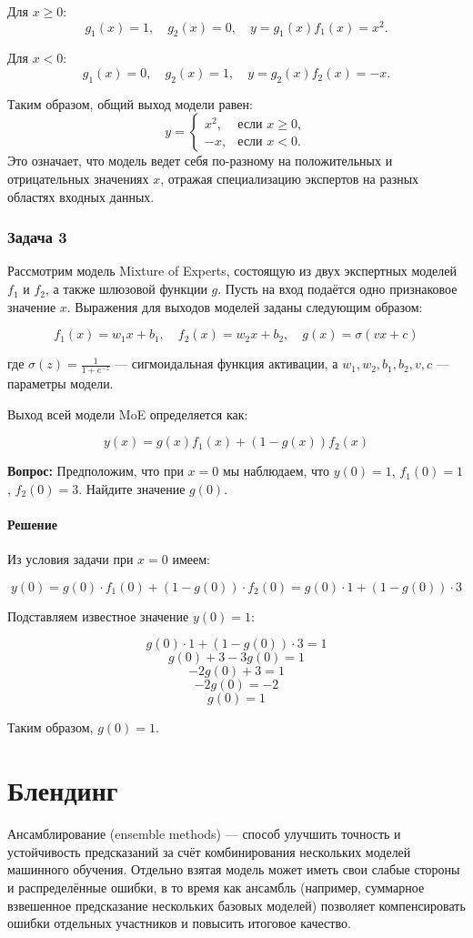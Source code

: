 Для $x \geq 0$: 
$$
g_1(x) = 1, \quad g_2(x) = 0, \quad y = g_1(x) f_1(x) = x^2.
$$

Для $x < 0$: 
$$
g_1(x) = 0, \quad g_2(x) = 1, \quad y = g_2(x) f_2(x) = -x.
$$

Таким образом, общий выход модели равен:
$$
y = 
\begin{cases} 
x^2, & \text{если } x \geq 0, \\ 
-x, & \text{если } x < 0.
\end{cases}
$$
Это означает, что модель ведет себя по-разному на положительных и отрицательных значениях $x$, отражая специализацию экспертов на разных областях входных данных.

\subsubsection{Задача 3}

Рассмотрим модель Mixture of Experts, состоящую из двух экспертных моделей $f_1$ и $f_2$, а также шлюзовой функции $g$. Пусть на вход подаётся одно признаковое значение $x$. Выражения для выходов моделей заданы следующим образом:

$$
f_1(x) = w_1 x + b_1, \quad f_2(x) = w_2 x + b_2, \quad g(x) = \sigma(v x + c)
$$

где $\sigma(z) = \frac{1}{1 + e^{-z}}$ — сигмоидальная функция активации, а $w_1, w_2, b_1, b_2, v, c$ — параметры модели.

Выход всей модели MoE определяется как:

$$
y(x) = g(x) f_1(x) + (1 - g(x)) f_2(x)
$$

\textbf{Вопрос:} Предположим, что при $x = 0$ мы наблюдаем, что $y(0) = 1$, $f_1(0) = 1$, $f_2(0) = 3$. Найдите значение $g(0)$.

\paragraph{Решение}

Из условия задачи при $x = 0$ имеем:

$$
y(0) = g(0) \cdot f_1(0) + (1 - g(0)) \cdot f_2(0) = g(0) \cdot 1 + (1 - g(0)) \cdot 3
$$

Подставляем известное значение $y(0) = 1$:

$$
g(0) \cdot 1 + (1 - g(0)) \cdot 3 = 1
$$
$$
g(0) + 3 - 3g(0) = 1
$$
$$
-2g(0) + 3 = 1
$$
$$
-2g(0) = -2
$$
$$
g(0) = 1
$$

Таким образом, $g(0) = 1$.


\section{Блендинг}
Ансамблирование (ensemble methods) --- способ улучшить точность и устойчивость предсказаний за счёт комбинирования нескольких моделей машинного обучения. Отдельно взятая модель может иметь свои слабые стороны и распределённые ошибки, в то время как ансамбль (например, суммарное взвешенное предсказание нескольких базовых моделей) позволяет компенсировать ошибки отдельных участников и повысить итоговое качество.

